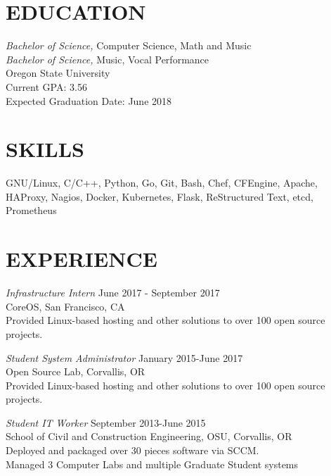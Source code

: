 \documentclass[line,margin]{res}
\begin{document}
\address{(503)-758-6952, fahlmantaylor@gmail.com}
\address{github.com/fahlmant, linkedin.com/in/taylorfahlman}
\begin{resume}


\section{EDUCATION}
                    {\sl Bachelor of Science,} Computer Science, Math and Music \\
                    {\sl Bachelor of Science,} Music, Vocal Performance \\
                    Oregon State University\\
                    Current GPA: 3.56\\
                    Expected Graduation Date: June 2018
                    
\section{SKILLS}
                    GNU/Linux, C/C++, Python, Go, Git, Bash, Chef, CFEngine, Apache, HAProxy, Nagios, Docker, Kubernetes,
                    Flask, ReStructured Text, etcd, Prometheus
\section{EXPERIENCE}
                    {\sl Infrastructure Intern} \hfill June 2017 - September 2017\\
                    CoreOS,
                    San Francisco, CA\\
                    Provided Linux-based hosting and other solutions to over 100 open source projects.

                    {\sl Student System Administrator} \hfill January 2015-June 2017\\
                    Open Source Lab, 
                    Corvallis, OR\\
                    Provided Linux-based hosting and other solutions to over 100 open source projects.

                    {\sl Student IT Worker} \hfill September 2013-June 2015 \\
                    School of Civil and Construction Engineering, OSU, 
                    Corvallis, OR\\ 
                    Deployed and packaged over 30 pieces software via SCCM.\\
                    Managed 3 Computer Labs and multiple Graduate Student systems


\end{resume}
\end{document}
